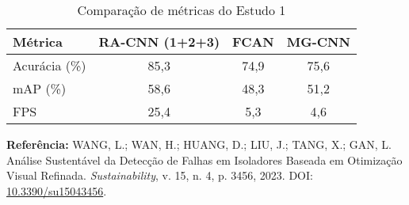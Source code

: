 \begin{table}[h]
    \label{tab:comparacao_de_metricas_do_estudo_1}
    \centering
    \caption{Comparação de métricas do Estudo 1}
    \begin{tabular}{lccc}
        \hline
        \textbf{Métrica} & \textbf{RA-CNN (1+2+3)} & \textbf{FCAN} & \textbf{MG-CNN} \\
        \hline
        Acurácia (\%) & 85,3 & 74,9 & 75,6 \\
        mAP (\%) & 58,6 & 48,3 & 51,2 \\
        FPS & 25,4 & 5,3 & 4,6 \\
        \hline
    \end{tabular}
\end{table}

\textbf{Referência:} WANG, L.; WAN, H.; HUANG, D.; LIU, J.; TANG, X.; GAN, L. Análise Sustentável da Detecção de Falhas em Isoladores Baseada em Otimização Visual Refinada. \textit{Sustainability}, v. 15, n. 4, p. 3456, 2023. DOI: \href{https://doi.org/10.3390/su15043456}{10.3390/su15043456}.

